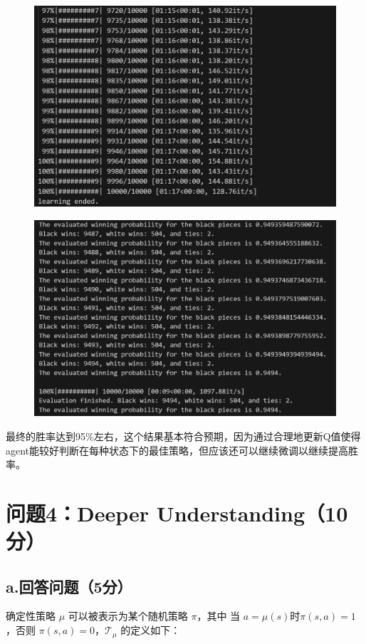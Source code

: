 \documentclass{article}
\begin{document}
\begin{figure}[H]
    \centering
    \includegraphics[width=14cm]{3.png}
\end{figure}
\begin{figure}[H]
    \centering
    \includegraphics[width=14cm]{4.png}
\end{figure}
最终的胜率达到95\%左右，这个结果基本符合预期，因为通过合理地更新Q值使得agent能较好判断在每种状态下的最佳策略，但应该还可以继续微调以继续提高胜率。
\section*{问题4：Deeper Understanding（10分）}
\subsection*{a.回答问题（5分）}
确定性策略 $\mu$ 可以被表示为某个随机策略 $\pi$，其中 当 $a = \mu(s)$时$\pi(s, a) = 1$ ，否则 $\pi(s, a) = 0$，$\mathcal{T}_\mu$ 的定义如下：
\end{document}
